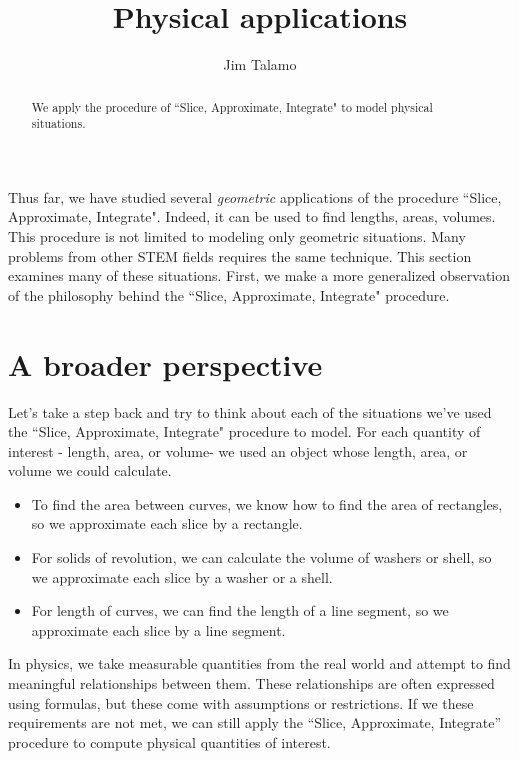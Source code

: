\documentclass{ximera}
\author{Jim Talamo}
\title[Dig-In:]{Physical applications}
\begin{document}
\begin{abstract}
We apply the procedure of ``Slice, Approximate, Integrate" to model physical situations.
\end{abstract}
\maketitle

Thus far, we have studied several \emph{geometric} applications of the procedure  ``Slice, Approximate, Integrate".  Indeed, it can be used to find lengths, areas, volumes.  This procedure is not limited to modeling only geometric situations.  Many problems from other STEM fields requires the same technique.  This section examines many of these situations.  First, we make a more generalized observation of the philosophy behind the ``Slice, Approximate, Integrate" procedure.

\section{A broader perspective}
Let's take a step back and try to think about each of the situations we've used the ``Slice, Approximate, Integrate" procedure to model.  For each quantity of interest - length, area, or volume- we used an object whose length, area, or volume we could calculate.  

\begin{itemize}
\item To find the area between curves, we know how to find the area of rectangles, so we approximate each slice by a rectangle.  
\item For solids of revolution, we can calculate the volume of washers or shell, so we approximate each slice by a washer or a shell. 
\item For length of curves, we can find the length of a line segment, so we approximate each slice by a line segment.
\end{itemize}

In physics, we take measurable quantities from the real world and attempt to find meaningful relationships between them.  These relationships are often expressed using formulas, but these come with assumptions or restrictions.  If we these requirements are not met, we can still apply the ``Slice, Approximate, Integrate'' procedure to compute physical quantities of interest.
\end{document}
